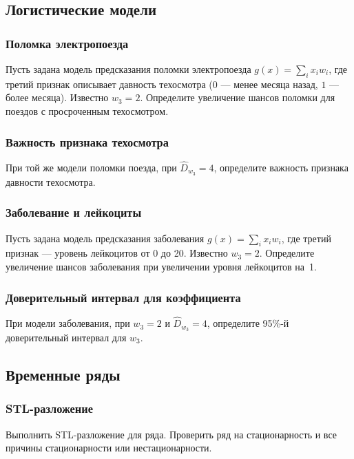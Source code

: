 \subsection{Логистические модели}

\subsubsection{Поломка электропоезда}

Пусть задана модель предсказания поломки электропоезда $g(x)=\sum_i x_i w_i$, где третий признак описывает давность техосмотра ($0$ --- менее месяца назад, $1$ --- более месяца). Известно $w_3=2$. Определите увеличение шансов поломки для поездов с просроченным техосмотром.

\subsubsection{Важность признака техосмотра}

При той же модели поломки поезда, при $\widehat{D}_{w_3}=4$, определите важность признака давности техосмотра.

\subsubsection{Заболевание и лейкоциты}

Пусть задана модель предсказания заболевания $g(x)=\sum_i x_i w_i$, где третий признак --- уровень лейкоцитов от 0 до 20. Известно $w_3=2$. Определите увеличение шансов заболевания при увеличении уровня лейкоцитов на~1.

\subsubsection{Доверительный интервал для коэффициента}

При модели заболевания, при $w_3=2$ и $\widehat{D}_{w_3}=4$, определите 95\%-й доверительный интервал для $w_3$.

\subsection{Временные ряды}

\subsubsection{STL-разложение}

Выполнить STL-разложение для ряда. Проверить ряд на стационарность и все причины стационарности или нестационарности.


